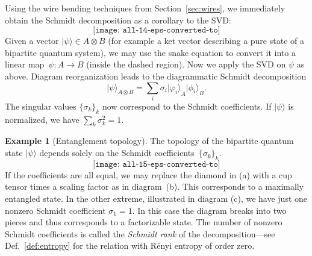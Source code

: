 \documentclass[aps,pra,12pt,nofootinbib,superscriptaddress,longbibliography]{revtex4-1}
\newcommand{\jb}[1]{\todo[inline]{{\textbf{[}JB: #1\textbf{]}}}}
\theoremstyle{plain}
\theoremstyle{definition}
\newtheorem{example}[theorem]{Example}
\newcommand{\ket}[1]{\mbox{$|#1\rangle$}}
\newcommand{\be}{\begin{equation}}
\newcommand{\ee}{\end{equation}}
\begin{document}


Using the wire bending techniques from Section~\ref{sec:wires},
we immediately obtain the Schmidt decomposition as a corollary to the SVD:
\be
\label{fig:SVD-Schmidt2}
\texttt{[image: all-14-eps-converted-to]}
\ee
Given a vector $\ket{\psi} \in A \otimes B$ (for example a ket vector
describing a pure state of a bipartite quantum system),
we may use the snake equation to
convert it into a linear map~$\psi:A \to B$ (inside the dashed region). 
Now we apply the SVD on $\psi$ as above.
Diagram reorganization leads to the diagrammatic Schmidt decomposition
\be
\ket{\psi}_{A\otimes B} = \sum_i \sigma_i \ket{\varphi_i}_A\ket{\phi_i}_B.
\ee
The singular values $\{\sigma_k\}_k$ now correspond to the Schmidt coefficients.
If $\ket{\psi}$ is normalized, we have $\sum_k \sigma_k^2 = 1$.


\begin{example}[Entanglement topology]
\label{example:entanglement-topology}
The topology of the bipartite quantum state
$\ket{\psi}$
depends solely on the Schmidt coefficients~$\{\sigma_k\}_k$.
\be
\texttt{[image: all-15-eps-converted-to]}
\ee
If the coefficients are all equal, we may
replace the diamond in (a) with a cup tensor times a scaling factor
as in diagram~(b).
This corresponds to a maximally entangled state.
In the other extreme, illustrated in diagram (c), we have just one
nonzero Schmidt coefficient $\sigma_1 = 1$. In this case the diagram
breaks into two pieces and thus corresponds to a factorizable state. The number of nonzero Schmidt coefficients is called the \emph{Schmidt rank}
of the decomposition---see Def.~\ref{def:entropy} for the relation with R{\'e}nyi entropy of order zero.
\end{example}

\end{document}
